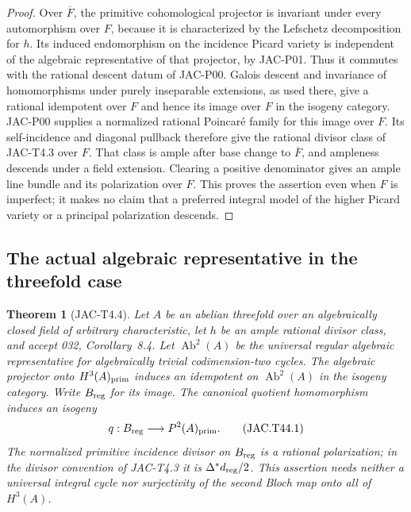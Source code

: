 \documentclass[11pt,a4paper]{article}
\newtheorem{theorem}{Theorem}[section]
\begin{document}
\begin{proof}
Over $\overline F$, the primitive cohomological projector is invariant
under every automorphism over $F$, because it is characterized by the
Lefschetz decomposition for $h$. Its induced endomorphism on the
incidence Picard variety is independent of the algebraic representative
of that projector, by JAC-P01. Thus it commutes with the rational
descent datum of JAC-P00. Galois descent and invariance of homomorphisms
under purely inseparable extensions, as used there, give a rational
idempotent over $F$ and hence its image over $F$ in the isogeny category.
JAC-P00 supplies a normalized rational Poincar\'e family for this image
over $F$. Its self-incidence and diagonal pullback therefore give the
rational divisor class of JAC-T4.3 over $F$. That class is ample after
base change to $\overline F$, and ampleness descends under a field
extension. Clearing a positive denominator gives an ample line bundle
and its polarization over $F$. This proves the assertion even when
$F$ is imperfect; it makes no claim that a preferred integral model of
the higher Picard variety or a principal polarization descends.
\end{proof}


\subsection{The actual algebraic representative in the threefold case}

\begin{theorem}[JAC-T4.4]
\label{thm:T44}
Let $A$ be an abelian threefold over an algebraically closed field of
arbitrary characteristic, let $h$ be an ample rational divisor class,
and accept 032, Corollary~8.4. Let $\operatorname{Ab}^2(A)$ be the
universal regular algebraic representative for algebraically trivial
codimension-two cycles. The algebraic projector onto
$H^3(A)_{\rm prim}$ induces an idempotent on
$\operatorname{Ab}^2(A)$ in the isogeny category. Write $B_{\rm reg}$
for its image. The canonical quotient homomorphism induces an isogeny
\[
 q:B_{\rm reg}\longrightarrow P^2(A)_{\rm prim}.
                                                        \tag{JAC.T44.1}
\]
The normalized primitive incidence divisor on $B_{\rm reg}$ is a
rational polarization; in the divisor convention of JAC-T4.3 it is
$\Delta^*d_{\rm reg}/2$. This assertion needs neither a universal
integral cycle nor surjectivity of the second Bloch map onto all of
$H^3(A)$.
\end{theorem}
\end{document}

